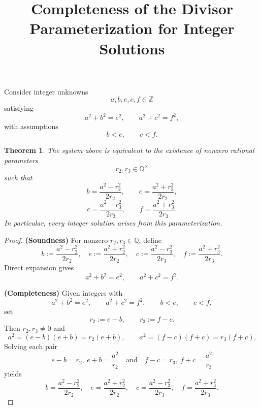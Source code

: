 \documentclass[11pt]{article}
\newtheorem{theorem}{Theorem}
\begin{document}
\title{Completeness of the Divisor Parameterization for Integer Solutions}
\author{}
\date{}
\maketitle

Consider integer unknowns
\[
a,b,e,c,f\in\mathbb Z
\]
satisfying
\[
a^2+b^2=e^2,\qquad a^2+c^2=f^2,
\]
with assumptions
\[
b<e,\qquad c<f.
\]

\begin{theorem}
The system above is equivalent to the existence of nonzero rational parameters
\[
r_2,r_3\in\mathbb Q^\times
\]
such that
\[
b=\frac{a^2-r_2^2}{2r_2},\qquad
e=\frac{a^2+r_2^2}{2r_2},
\]
\[
c=\frac{a^2-r_3^2}{2r_3},\qquad
f=\frac{a^2+r_3^2}{2r_3}.
\]
In particular, every integer solution arises from this parameterization.
\end{theorem}

\begin{proof}
\textbf{(Soundness)}
For nonzero $r_2,r_3\in\mathbb Q$, define
\[
b:=\frac{a^2-r_2^2}{2r_2},\quad
e:=\frac{a^2+r_2^2}{2r_2},\quad
c:=\frac{a^2-r_3^2}{2r_3},\quad
f:=\frac{a^2+r_3^2}{2r_3}.
\]
Direct expansion gives
\[
a^2+b^2=e^2,\qquad a^2+c^2=f^2.
\]

\medskip
\textbf{(Completeness)}
Given integers with
\[
a^2+b^2=e^2,\qquad a^2+c^2=f^2,\qquad b<e,\qquad c<f,
\]
set
\[
r_2:=e-b,\qquad r_3:=f-c.
\]
Then $r_2,r_3\neq 0$ and
\[
a^2=(e-b)(e+b)=r_2(e+b),\qquad
a^2=(f-c)(f+c)=r_3(f+c).
\]
Solving each pair
\[
e-b=r_2,\ e+b=\frac{a^2}{r_2}
\quad\text{and}\quad
f-c=r_3,\ f+c=\frac{a^2}{r_3}
\]
yields
\[
b=\frac{a^2-r_2^2}{2r_2},\quad
e=\frac{a^2+r_2^2}{2r_2},\quad
c=\frac{a^2-r_3^2}{2r_3},\quad
f=\frac{a^2+r_3^2}{2r_3}.
\]
\end{proof}
\end{document}
